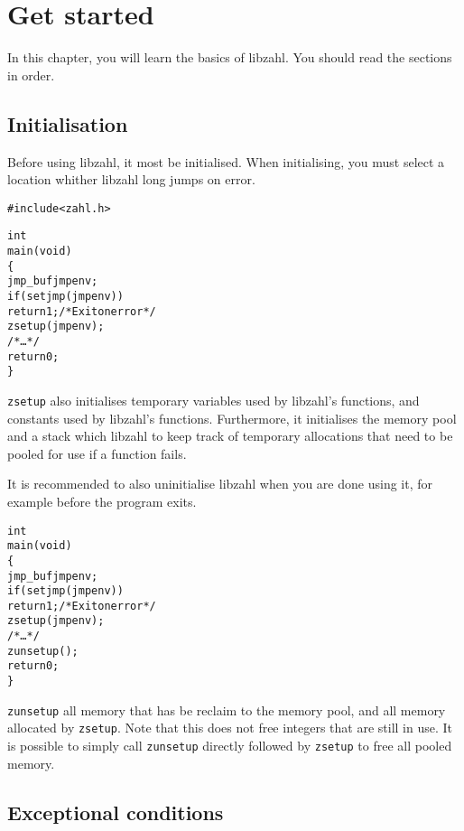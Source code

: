 \chapter{Get started}
\label{chap:Get started}

In this chapter, you will learn the basics of libzahl.
You should read the sections in order.

\vspace{1cm}
\minitoc


\newpage
\section{Initialisation}
\label{sec:Initialisation}

Before using libzahl, it most be initialised. When
initialising, you must select a location whither libzahl
long jumps on error.

\begin{alltt}
   #include <zahl.h>

   int
   main(void)
   \{
       jmp_buf jmpenv;
       if (setjmp(jmpenv))
           return 1; \textcolor{c}{/* \textrm{Exit on error} */}
       zsetup(jmpenv);
       \textcolor{c}{/* \textrm{\ldots} */}
       return 0;
   \}
\end{alltt}

{\tt zsetup} also initialises temporary variables used
by libzahl's functions, and constants used by libzahl's
functions. Furthermore, it initialises the memory pool
and a stack which libzahl to keep track of temporary
allocations that need to be pooled for use if a function
fails.

It is recommended to also uninitialise libzahl when you
are done using it, for example before the program exits.

\begin{alltt}
   \textcolor{c}{int
   main(void)
   \{
       jmp_buf jmpenv;
       if (setjmp(jmpenv))
           return 1; /* \textrm{Exit on error} */
       zsetup(jmpenv);
       /* \textrm{\ldots} */}
       zunsetup();
       \textcolor{c}{return 0;
   \}}
\end{alltt}

{\tt zunsetup} all memory that has be reclaim to the
memory pool, and all memory allocated by {\tt zsetup}.
Note that this does not free integers that are still
in use. It is possible to simply call {\tt zunsetup}
directly followed by {\tt zsetup} to free all pooled
memory.


\newpage
\section{Exceptional conditions}
\label{sec:Exceptional conditions}

